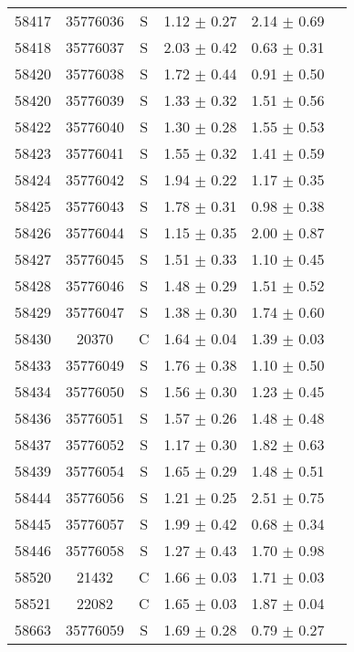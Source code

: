 \begin{center}
\begin{longtable}{cccccc}
58417 & 35776036 & S & 1.12 $\pm$ 0.27 & 2.14 $\pm$ 0.69 & \\
58418 & 35776037 & S & 2.03 $\pm$ 0.42 & 0.63 $\pm$ 0.31 & \\
58420 & 35776038 & S & 1.72 $\pm$ 0.44 & 0.91 $\pm$ 0.50 & \\
58420 & 35776039 & S & 1.33 $\pm$ 0.32 & 1.51 $\pm$ 0.56 & \\
58422 & 35776040 & S & 1.30 $\pm$ 0.28 & 1.55 $\pm$ 0.53 & \\
58423 & 35776041 & S & 1.55 $\pm$ 0.32 & 1.41 $\pm$ 0.59 & \\
58424 & 35776042 & S & 1.94 $\pm$ 0.22 & 1.17 $\pm$ 0.35 & \\
58425 & 35776043 & S & 1.78 $\pm$ 0.31 & 0.98 $\pm$ 0.38 & \\
58426 & 35776044 & S & 1.15 $\pm$ 0.35 & 2.00 $\pm$ 0.87 & \\
58427 & 35776045 & S & 1.51 $\pm$ 0.33 & 1.10 $\pm$ 0.45 & \\
58428 & 35776046 & S & 1.48 $\pm$ 0.29 & 1.51 $\pm$ 0.52 & \\
58429 & 35776047 & S & 1.38 $\pm$ 0.30 & 1.74 $\pm$ 0.60 & \\
58430 & 20370 & C & 1.64 $\pm$ 0.04 & 1.39 $\pm$ 0.03 & \\
58433 & 35776049 & S & 1.76 $\pm$ 0.38 & 1.10 $\pm$ 0.50 & \\
58434 & 35776050 & S & 1.56 $\pm$ 0.30 & 1.23 $\pm$ 0.45 & \\
58436 & 35776051 & S & 1.57 $\pm$ 0.26 & 1.48 $\pm$ 0.48 & \\
58437 & 35776052 & S & 1.17 $\pm$ 0.30 & 1.82 $\pm$ 0.63 & \\
58439 & 35776054 & S & 1.65 $\pm$ 0.29 & 1.48 $\pm$ 0.51 & \\
58444 & 35776056 & S & 1.21 $\pm$ 0.25 & 2.51 $\pm$ 0.75 & \\
58445 & 35776057 & S & 1.99 $\pm$ 0.42 & 0.68 $\pm$ 0.34 & \\
58446 & 35776058 & S & 1.27 $\pm$ 0.43 & 1.70 $\pm$ 0.98 & \\
58520 & 21432 & C & 1.66 $\pm$ 0.03 & 1.71 $\pm$ 0.03 & \\
58521 & 22082 & C & 1.65 $\pm$ 0.03 & 1.87 $\pm$ 0.04 & \\
58663 & 35776059 & S & 1.69 $\pm$ 0.28 & 0.79 $\pm$ 0.27 & \\
\hline

\end{longtable}

\end{center}


